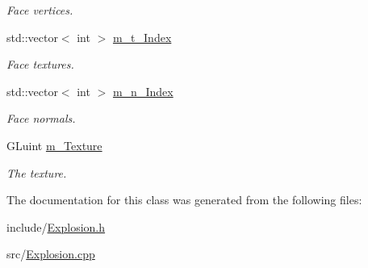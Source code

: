 \begin{DoxyCompactItemize}
\begin{DoxyCompactList}\small\item\em Face vertices. \end{DoxyCompactList}\item 
\hypertarget{classExplosion_a518650f1367626b2bda1c8f927a1c1e1}{std\-::vector$<$ int $>$ \hyperlink{classExplosion_a518650f1367626b2bda1c8f927a1c1e1}{m\-\_\-t\-\_\-\-Index}}\label{classExplosion_a518650f1367626b2bda1c8f927a1c1e1}

\begin{DoxyCompactList}\small\item\em Face textures. \end{DoxyCompactList}\item 
\hypertarget{classExplosion_a34d9fcaefb7a39783fc3abfecf72b66a}{std\-::vector$<$ int $>$ \hyperlink{classExplosion_a34d9fcaefb7a39783fc3abfecf72b66a}{m\-\_\-n\-\_\-\-Index}}\label{classExplosion_a34d9fcaefb7a39783fc3abfecf72b66a}

\begin{DoxyCompactList}\small\item\em Face normals. \end{DoxyCompactList}\item 
\hypertarget{classExplosion_a250e76c5c02fb1072358f55c5f45f5a1}{G\-Luint \hyperlink{classExplosion_a250e76c5c02fb1072358f55c5f45f5a1}{m\-\_\-\-Texture}}\label{classExplosion_a250e76c5c02fb1072358f55c5f45f5a1}

\begin{DoxyCompactList}\small\item\em The texture. \end{DoxyCompactList}\end{DoxyCompactItemize}


The documentation for this class was generated from the following files\-:\begin{DoxyCompactItemize}
\item 
include/\hyperlink{Explosion_8h}{Explosion.\-h}\item 
src/\hyperlink{Explosion_8cpp}{Explosion.\-cpp}\end{DoxyCompactItemize}
